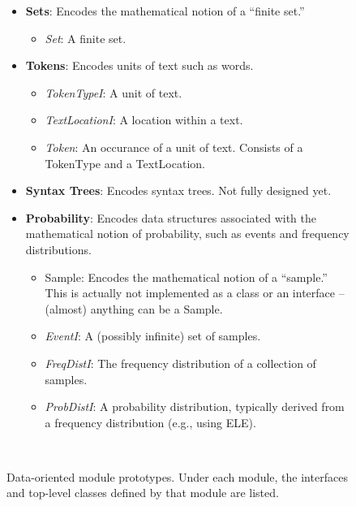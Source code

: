 \documentclass{article}
\begin{document}
\begin{figure}
\noindent
\begin{centering}
\begin{boxedminipage}{.95\textwidth}
\begin{itemize}
  \item \textbf{Sets}: Encodes the mathematical notion of a ``finite set.''
  \begin{itemize}
    \item \textit{Set}: A finite set.
  \end{itemize}

  \item \textbf{Tokens}: Encodes units of text such as words.
  \begin{itemize}
    \item \textit{TokenTypeI}:
         A unit of text.
    \item \textit{TextLocationI}:
         A location within a text.
    \item \textit{Token}:
         An occurance of a unit of text.
         Consists of a TokenType and a TextLocation.
  \end{itemize}

  \item \textbf{Syntax Trees}: Encodes syntax trees.  Not fully designed 
        yet.

  \item \textbf{Probability}: Encodes data structures associated with
        the mathematical notion of probability, such as events and
        frequency distributions.
  \begin{itemize}
    \item Sample: Encodes the mathematical notion of a
          ``sample.''  This is actually not implemented as a class or
          an interface -- (almost) anything can be a Sample.
    \item \textit{EventI}:
         A (possibly infinite) set of samples.
    \item \textit{FreqDistI}:
          The frequency distribution of a collection of samples.
    \item \textit{ProbDistI}:
          A probability distribution, typically derived from a
          frequency distribution (e.g., using ELE).
  \end{itemize}
\end{itemize}
\end{boxedminipage}\\
\end{centering}
 \caption[Data-oriented module prototypes]{Data-oriented module
 prototypes.  Under each module, the interfaces and top-level classes
 defined by that module are listed.}
\label{fig:mod-data}
\end{figure}
\end{document}
